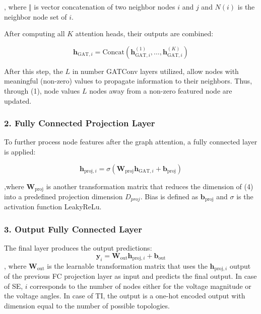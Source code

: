 \documentclass[journal]{IEEEtran}  %
\begin{document}
, where $\Vert$ is vector concatenation of two neighbor nodes $i$ and $j$ and ${N}(i)$ is the neighbor node set of $i$.

After computing all $K$ attention heads, their outputs are combined:

\begin{equation}
\label{eq:head_concatenation}
\mathbf{h}_{\text{GAT}, i} = \text{Concat} \left( \mathbf{h}_{\text{GAT}, i}^{(1)}, \dots, \mathbf{h}_{\text{GAT}, i}^{(K)} \right)
\end{equation}

After this step, the $L$ in number GATConv layers utilized, allow nodes with meaningful (non-zero) values to propagate information to their neighbors. Thus, through (1), node values $L$ nodes away from a non-zero featured node are updated.


\subsubsection*{2. Fully Connected Projection Layer}

To further process node features after the graph attention, a fully connected layer is applied:

\begin{equation}
\label{eq:FC_projection}
\mathbf{h}_{\text{proj}, i} = \sigma \left( \mathbf{W}_{\text{proj}} \mathbf{h}_{\text{GAT}, i} + \mathbf{b}_{\text{proj}} \right)
\end{equation}

,where $\mathbf{W}_{\text{proj}}$ is another transformation matrix that reduces the dimension of (4) into a predefined projection dimension $D_{proj}$. Bias is defined as $\mathbf{b}_{\text{proj}}$ and $\sigma$ is the activation function LeakyReLu.

\subsubsection*{3. Output Fully Connected Layer}

The final layer produces the output predictions:
\begin{equation}
\label{eq:FC_output}
\mathbf{y}_i = \mathbf{W}_{\text{out}} \mathbf{h}_{\text{proj}, i} + \mathbf{b}_{\text{out}}
\end{equation},
where $\mathbf{W}_{\text{out}}$ is the learnable transformation matrix that uses the $\mathbf{h}_{\text{proj}, i}$ output of the previous FC projection layer as input and predicts the final output. In case of SE, $i$ corresponds to the number of nodes either for the voltage magnitude or the voltage angles. In case of TI, the output is a one-hot encoded output with dimension equal to the number of possible topologies.
\end{document}
